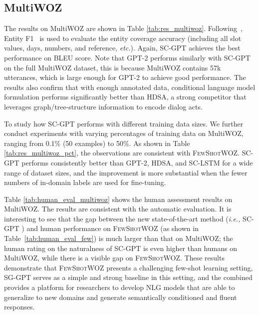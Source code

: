 \documentclass[11pt,a4paper]{article}
\newcommand{\ie}[0]{\emph{i.e., }}
\newcommand{\etc}[0]{\emph{etc.}}
\newcommand{\data}{\textsc{FewShotWOZ}}
\begin{document}
\subsection{MultiWOZ}
The results on MultiWOZ are shown in Table \ref{tab:res_multiwoz}. 
Following~\citet{chen-etal-2019-semantically}, Entity F1~\cite{wen2016network} is used to evaluate the entity coverage accuracy (including all slot values, days, numbers, and reference, \etc).
Again, SC-GPT achieves the best performance on BLEU score. Note that GPT-2 performs similarly with SC-GPT on the full MultiWOZ dataset, this is because MultiWOZ contains 57k utterances, which is large enough for GPT-2 to achieve good performance. 
The results also confirm that with enough annotated data, conditional language model formulation performs significantly better than HDSA, a strong competitor that leverages graph/tree-structure information to encode dialog acts. 

To study how SC-GPT performs with different training data sizes. We further conduct experiments with varying percentages of training data on MultiWOZ, ranging from 0.1\% (50 examples) to 50\%. As shown in Table \ref{tab:res_multiwoz_pct}, the observations are consistent with \data{}. SC-GPT performs consistently better than GPT-2, HDSA, and SC-LSTM for a wide range of dataset sizes, and the improvement is more substantial when the fewer numbers of in-domain labels are used for fine-tuning.


Table \ref{tab:human_eval_multiwoz} shows the human assessment results on MultiWOZ. The results are consistent with the automatic evaluation. It is interesting to see that 
 the gap between the new state-of-the-art method (\ie SC-GPT ) and human performance on \data{} (as shown in Table~\ref{tab:human_eval_few}) is much larger than that on MultiWOZ; 
 the human rating on the naturalness of SC-GPT is even higher than humans on MultiWOZ, while there is a visible gap on \data{}. These results demonstrate that \data{} presents a challenging few-shot learning setting, SG-GPT serves as a simple and strong baseline in this setting, and the combined provides a platform for researchers to develop NLG models that are able to generalize to new domains and generate semantically conditioned and fluent responses.
\end{document}
